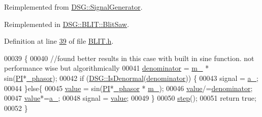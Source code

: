 Reimplemented from \hyperlink{class_d_s_g_1_1_signal_generator_a46fe75a81a242e191c5049d33ddf4155}{D\+S\+G\+::\+Signal\+Generator}.



Reimplemented in \hyperlink{class_d_s_g_1_1_b_l_i_t_1_1_blit_saw_ae24821c51b23b9fe9220a620e558af04}{D\+S\+G\+::\+B\+L\+I\+T\+::\+Blit\+Saw}.



Definition at line \hyperlink{_b_l_i_t_8h_source_l00039}{39} of file \hyperlink{_b_l_i_t_8h_source}{B\+L\+I\+T.\+h}.


\begin{DoxyCode}
00039                                                             \{
00040             \textcolor{comment}{//found better results in this case with built in sine function. not performance wise but
       algorithmically}
00041             \hyperlink{class_d_s_g_1_1_b_l_i_t_1_1_blit_a6de89a5a240f226c940aef97661c9cee}{denominator} = \hyperlink{class_d_s_g_1_1_b_l_i_t_1_1_blit_afa6e4d46efdbfa032762610601ed42a0}{m\_} * sin(\hyperlink{_p_i_8h_a598a3330b3c21701223ee0ca14316eca}{PI}*\hyperlink{class_d_s_g_1_1_signal_generator_a1e23eb94e204b11db75fca030b951065}{\_phasor});
00042             \textcolor{keywordflow}{if} (\hyperlink{namespace_d_s_g_a9eee3c39a1f45d42f0b4fa7201d3ba3d}{DSG::IsDenormal}(\hyperlink{class_d_s_g_1_1_b_l_i_t_1_1_blit_a6de89a5a240f226c940aef97661c9cee}{denominator})) \{
00043                 signal = \hyperlink{class_d_s_g_1_1_b_l_i_t_1_1_blit_a66e2a97840ad0772daaaa9aea63b77b4}{a\_};
00044             \}\textcolor{keywordflow}{else}\{
00045                 \hyperlink{class_d_s_g_1_1_b_l_i_t_1_1_blit_ac8fb9d4fb45d0697bf364bb5d6b570ce}{value} = sin(\hyperlink{_p_i_8h_a598a3330b3c21701223ee0ca14316eca}{PI}*\hyperlink{class_d_s_g_1_1_signal_generator_a1e23eb94e204b11db75fca030b951065}{\_phasor} * \hyperlink{class_d_s_g_1_1_b_l_i_t_1_1_blit_afa6e4d46efdbfa032762610601ed42a0}{m\_});
00046                 \hyperlink{class_d_s_g_1_1_b_l_i_t_1_1_blit_ac8fb9d4fb45d0697bf364bb5d6b570ce}{value}/=\hyperlink{class_d_s_g_1_1_b_l_i_t_1_1_blit_a6de89a5a240f226c940aef97661c9cee}{denominator};
00047                 \hyperlink{class_d_s_g_1_1_b_l_i_t_1_1_blit_ac8fb9d4fb45d0697bf364bb5d6b570ce}{value}*=\hyperlink{class_d_s_g_1_1_b_l_i_t_1_1_blit_a66e2a97840ad0772daaaa9aea63b77b4}{a\_};
00048                 signal = \hyperlink{class_d_s_g_1_1_b_l_i_t_1_1_blit_ac8fb9d4fb45d0697bf364bb5d6b570ce}{value};
00049             \}
00050             \hyperlink{class_d_s_g_1_1_signal_generator_a4c034c5b9ef3dc7548839288355643d5}{step}();
00051             \textcolor{keywordflow}{return} \textcolor{keyword}{true};
00052         \}
\end{DoxyCode}
